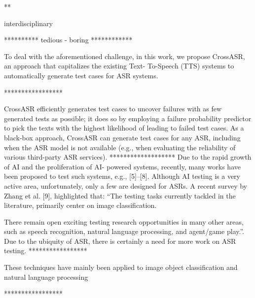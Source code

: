  **
 
 
 interdisciplinary
 
 **********
 tedious - boring
 ************
  
 To deal with the aforementioned challenge, in this work, we
propose CrossASR, an approach that capitalizes the existing Text- To-Speech (TTS) systems to automatically generate test cases for ASR systems.

*****************

CrossASR efficiently generates test cases to uncover failures with as few generated tests as possible; it does so by employing a failure probability predictor to pick the texts with the highest likelihood of leading to failed test cases. As a black-box approach, CrossASR can generate test cases for any ASR, including when the ASR model is not available (e.g., when evaluating the reliability of various third-party ASR services).
*******************
 Due to the rapid growth of AI and the proliferation of AI-
powered systems, recently, many works have been proposed to test such systems, e.g., [5]–[8]. Although AI testing is a very active area, unfortunately, only a few are designed for ASRs. A recent survey by Zhang et al. [9], highlighted that: “The testing tasks currently tackled in the literature, primarily center on image classification. 


There remain open exciting testing research opportunities in many other areas, such as speech recognition, natural language processing, and agent/game play.”. Due to the ubiquity of ASR, there is certainly a need for more work on ASR testing.
*****************

These techniques have mainly been applied to image object classification and natural language processing

*****************

 

